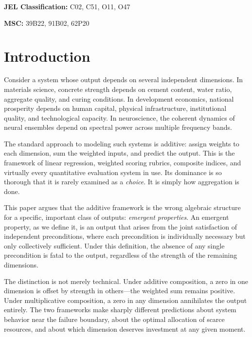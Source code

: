 \documentclass[12pt, a4paper]{article}
\theoremstyle{definition}
\theoremstyle{remark}
\begin{document}
\vspace{0.5em}
\noindent\textbf{JEL Classification:} C02, C51, O11, O47

\vspace{0.5em}
\noindent\textbf{MSC:} 39B22, 91B02, 62P20

\newpage
\tableofcontents
\newpage

\section{Introduction}\label{sec:intro}

Consider a system whose output depends on several independent dimensions. In materials science, concrete strength depends on cement content, water ratio, aggregate quality, and curing conditions. In development economics, national prosperity depends on human capital, physical infrastructure, institutional quality, and technological capacity. In neuroscience, the coherent dynamics of neural ensembles depend on spectral power across multiple frequency bands.

The standard approach to modeling such systems is additive: assign weights to each dimension, sum the weighted inputs, and predict the output. This is the framework of linear regression, weighted scoring rubrics, composite indices, and virtually every quantitative evaluation system in use. Its dominance is so thorough that it is rarely examined as a \textit{choice}. It is simply how aggregation is done.

This paper argues that the additive framework is the wrong algebraic structure for a specific, important class of outputs: \textit{emergent properties}. An emergent property, as we define it, is an output that arises from the joint satisfaction of independent preconditions, where each precondition is individually necessary but only collectively sufficient. Under this definition, the absence of any single precondition is fatal to the output, regardless of the strength of the remaining dimensions.

The distinction is not merely technical. Under additive composition, a zero in one dimension is offset by strength in others---the weighted sum remains positive. Under multiplicative composition, a zero in any dimension annihilates the output entirely. The two frameworks make sharply different predictions about system behavior near the failure boundary, about the optimal allocation of scarce resources, and about which dimension deserves investment at any given moment.
\end{document}
